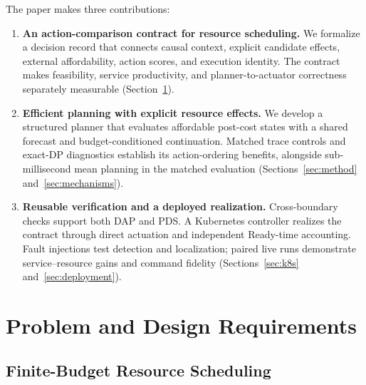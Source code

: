 \documentclass[acmsmall,screen,review,anonymous]{acmart}
\begin{document}
The paper makes three contributions:
\begin{enumerate}
  \item \textbf{An action-comparison contract for resource scheduling.}
  We formalize a decision record that connects causal context, explicit
  candidate effects, external affordability, action scores, and execution
  identity. The contract makes feasibility, service productivity, and
  planner-to-actuator correctness separately measurable
  (Section~\ref{sec:problem}).
  \item \textbf{Efficient planning with explicit resource effects.}
  We develop a structured planner that evaluates affordable post-cost states
  with a shared forecast and budget-conditioned continuation. Matched trace
  controls and exact-DP diagnostics establish its action-ordering benefits,
  alongside sub-millisecond mean planning in the matched evaluation
  (Sections~\ref{sec:method} and~\ref{sec:mechanisms}).
  \item \textbf{Reusable verification and a deployed realization.}
  Cross-boundary checks support both DAP and PDS. A Kubernetes controller
  realizes the contract through direct actuation and independent Ready-time
  accounting. Fault injections test detection and localization; paired live
  runs demonstrate service--resource gains and command fidelity
  (Sections~\ref{sec:k8s} and~\ref{sec:deployment}).
\end{enumerate}

\section{Problem and Design Requirements}
\label{sec:problem}

\subsection{Finite-Budget Resource Scheduling}
\end{document}
